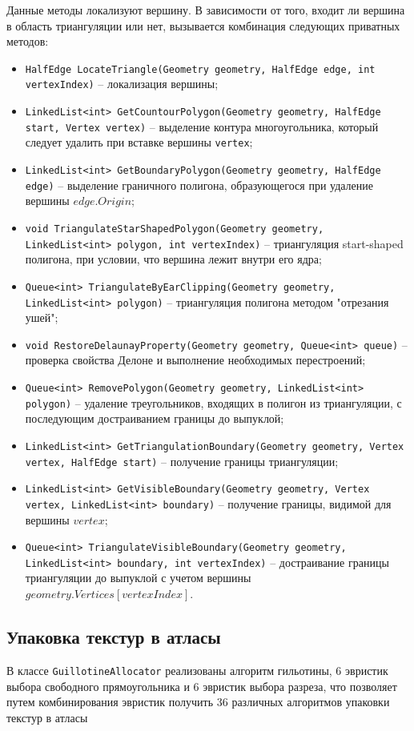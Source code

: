 \documentclass{fefu}
\begin{document}
Данные методы локализуют вершину. В зависимости от того, входит ли вершина в область триангуляции или нет, вызывается 
комбинация следующих приватных методов:
\begin{itemize}
    \item \texttt{HalfEdge LocateTriangle(Geometry geometry, HalfEdge edge, int vertexIndex)} -- локализация вершины;
    \item \texttt{LinkedList<int> GetCountourPolygon(Geometry geometry, HalfEdge start, Vertex vertex)} -- выделение контура 
    многоугольника, который следует удалить при вставке вершины \texttt{vertex};
    \item \texttt{LinkedList<int> GetBoundaryPolygon(Geometry geometry, HalfEdge edge)} -- выделение граничного полигона, 
    образующегося при удаление вершины $edge.Origin$;
    \item \texttt{void TriangulateStarShapedPolygon(Geometry geometry, LinkedList<int> polygon, int vertexIndex)} -- 
    триангуляция start-shaped полигона, при условии, что вершина лежит внутри его ядра;
    \item \texttt{Queue<int> TriangulateByEarClipping(Geometry geometry, LinkedList<int> polygon)} -- триангуляция полигона 
    методом "отрезания ушей";
    \item \texttt{void RestoreDelaunayProperty(Geometry geometry, Queue<int> queue)} -- проверка свойства Делоне и выполнение 
    необходимых перестроений;
    \item \texttt{Queue<int> RemovePolygon(Geometry geometry, LinkedList<int> polygon)} -- удаление треугольников, входящих в 
    полигон из триангуляции, с последующим достраиванием границы до выпуклой;
    \item \texttt{LinkedList<int> GetTriangulationBoundary(Geometry geometry, Vertex vertex, HalfEdge start)} -- получение 
    границы триангуляции;
    \item \texttt{LinkedList<int> GetVisibleBoundary(Geometry geometry, Vertex vertex, LinkedList<int> boundary)} -- получение 
    границы, видимой для вершины $vertex$;
    \item \texttt{Queue<int> TriangulateVisibleBoundary(Geometry geometry, LinkedList<int> boundary, int vertexIndex)} -- 
    достраивание границы триангуляции до выпуклой с учетом вершины $geometry.Vertices[vertexIndex]$.
\end{itemize}
\subsection{Упаковка текстур в атласы}
В классе \texttt{GuillotineAllocator} реализованы алгоритм гильотины, 6 эвристик выбора свободного прямоугольника и 6 
эвристик выбора разреза, что позволяет путем комбинирования эвристик получить 36 различных алгоритмов упаковки текстур в 
атласы
\end{document}
